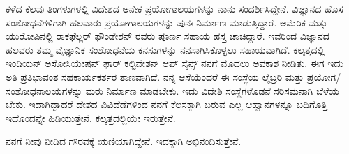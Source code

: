 ಕಳೆದ ಕೆಲವು ತಿಂಗಳುಗಳಲ್ಲಿ ವಿದೇಶದ ಅನೇಕ ಪ್ರಯೋಗಾಲಯಗಳನ್ನು ನಾನು ಸಂದರ್ಶಿಸಿದ್ದೇನೆ. ವಿಜ್ಞಾನದ ಹೊಸ ಸಂಶೋಧನೆಗಳಿಗಾಗಿ ಹಲವಾರು ಪ್ರಯೋಗಾಲಯಗಳನ್ನು ಪುನಃ ನಿರ್ಮಾಣ ಮಾಡುತ್ತಿದ್ದಾರೆ. ಅಮೆರಿಕ ಮತ್ತು ಯುರೋಪಿನಲ್ಲಿ ರಾಕಫೆಲ್ಲರ್ ಫೌಂಡೇಶನ್ ರವರು ಪೂರ್ಣ ಸಹಾಯ ಹಸ್ತ ಚಾಚಿದ್ದಾರೆ. ಇವರಿಂದ ವಿಜ್ಞಾನದ ಹಲವರು ತಮ್ಮ ವೈಜ್ಞಾನಿಕ ಸಂಶೋಧನೆಯ ಕನಸುಗಳನ್ನು ನನಸಾಗಿಸಿಕೊಳ್ಳಲು ಸಹಾಯವಾಗಿದೆ. ಕಲ್ಕತ್ತದಲ್ಲಿ ಇಂಡಿಯನ್ ಅಸೋಸಿಯೇಷನ್ ಫಾರ್ ಕಲ್ಟಿವೇಶನ್ ಆಫ್ ಸೈನ್ಸ್ ನನಗೆ ಮೊದಲು ಅವಕಾಶ ನೀಡಿತು. ಈಗ ಇದು ಅತಿ ಪ್ರತಿಭಾವಂತ ಸಹಕಾರ್ಯಕರ್ತರ ತಾಣವಾಗಿದೆ. ನನ್ನ ಆಸೆಯೆಂದರೆ ಈ ಸಂಸ್ಥೆಯ ಲೈಬ್ರರಿ ಮತ್ತು ಪ್ರಯೋಗ/ಸಂಶೋಧನಾಲಯಗಳನ್ನು ಮರು ನಿರ್ಮಾಣ ಮಾಡಬೇಕು. ಇದು ವಿದೇಶಿ ಸಂಸ್ಥೆಗಳೊಡನೆ ಸರಿಸಮನಾಗಿ ಬೆಳೆಯ ಬೇಕು. ಇದಾಗಿದ್ದಾದರೆ ದೇಶದ ವಿವಿದೆಡೆಗಳಿಂದ ನನಗೆ ಕೆಲಸಕ್ಕಾಗಿ ಬರುವ ಎಲ್ಲ ಆಹ್ವಾನಗಳನ್ನೂ ಬದಿಗೊತ್ತಿ ಇದೊಂದನ್ನೇ ಹಿಡಿಯುತ್ತೇನೆ. ಕಲ್ಕತ್ತದಲ್ಲಿಯೇ ಇರುತ್ತೇನೆ.

ನನಗೆ ನೀವು ನೀಡಿದ ಗೌರವಕ್ಕೆ ಋಣಿಯಾಗಿದ್ದೇನೆ. ಇದಕ್ಕಾಗಿ ಅಭಿನಂದಿಸುತ್ತೇನೆ.

